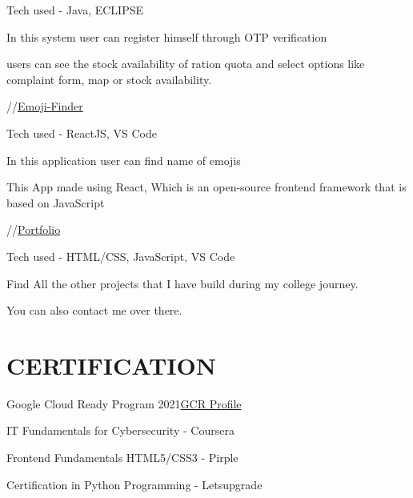 \documentclass[letterpaper]{deedy-resume} %
\begin{document}
\begin{minipage}[t]{0.66\textwidth}
\begin{tightitemize}
\item Tech used - Java, ECLIPSE\\
\item In this system user can register himself through OTP verification
\item users can see the stock availability of ration quota and select options like complaint form, map or stock availability. 
\end{tightitemize}
\sectionspace
{} //{{\href{https://6vmgd.csb.app/}{Emoji-Finder}}}


\begin{tightitemize}
\item Tech used - ReactJS, VS Code\\
\item In this application user can find name of emojis
\item This App made using React, Which is an open-source frontend framework that is based on JavaScript
\end{tightitemize}
\sectionspace
{} //{{\href{https://rushikeshmallanath.netlify.app/index.html}{Portfolio}}}


\begin{tightitemize}
\item Tech used - HTML/CSS, JavaScript, VS Code\\
\item Find All the other projects that I have build during my college journey.
\item You can also contact me over there.
\end{tightitemize}

\sectionspace %


\section{CERTIFICATION}
\sectionspace
\begin{tightitemize}
\item {{Google Cloud Ready Program 2021}}\href{https://www.cloudskillsboost.google/public_profiles/2341478f-c206-4e89-9e3d-6f848236d507}{GCR Profile} \\
\sectionspace
\item {{IT Fundamentals for Cybersecurity - Coursera}} \\
\sectionspace
\item{{Frontend Fundamentals HTML5/CSS3 - Pirple}}\\
\sectionspace
\item{{Certification in Python Programming - Letsupgrade}}
\end{tightitemize}


\end{minipage}
\end{document}
